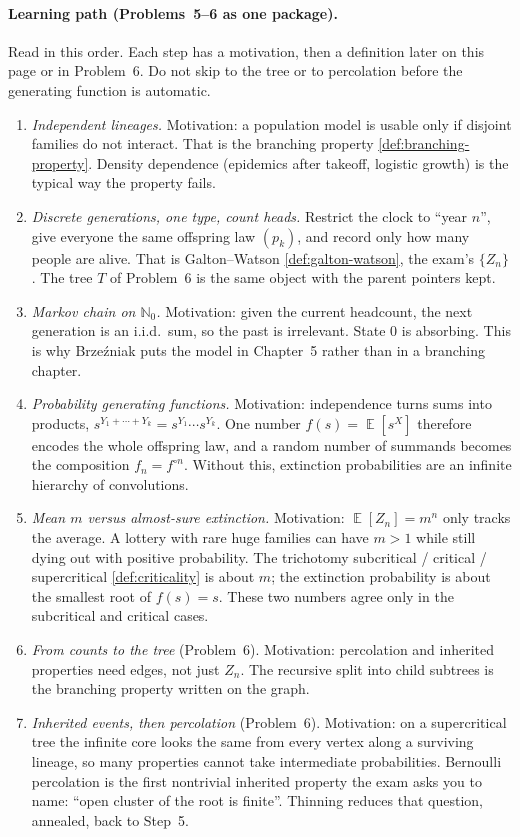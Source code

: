 \documentclass[11pt,a4paper]{article}
\DeclareMathOperator{\E}{\mathbb{E}}
\begin{document}
\paragraph{Learning path (Problems~5--6 as one package).}
Read in this order. Each step has a motivation, then a definition later on this page or in Problem~6. Do not skip to the tree or to percolation before the generating function is automatic.

\begin{enumerate}[label=\textup{Step~\arabic*.}]
    \item
    \emph{Independent lineages.} Motivation: a population model is usable only if disjoint families do not interact. That is the branching property \cref{def:branching-property}. Density dependence (epidemics after takeoff, logistic growth) is the typical way the property fails.
    \item
    \emph{Discrete generations, one type, count heads.} Restrict the clock to ``year \(n\)'', give everyone the same offspring law \((p_k)\), and record only how many people are alive. That is Galton--Watson \cref{def:galton-watson}, the exam's \(\{Z_n\}\). The tree \(T\) of Problem~6 is the same object with the parent pointers kept.
    \item
    \emph{Markov chain on \(\mathbb{N}_0\).} Motivation: given the current headcount, the next generation is an i.i.d.\ sum, so the past is irrelevant. State \(0\) is absorbing. This is why Brzeźniak puts the model in Chapter~5 rather than in a branching chapter.
    \item
    \emph{Probability generating functions.} Motivation: independence turns sums into products, \(s^{Y_1+\cdots+Y_k}=s^{Y_1}\cdots s^{Y_k}\). One number \(f(s)=\E[s^X]\) therefore encodes the whole offspring law, and a random number of summands becomes the composition \(f_n=f^{\circ n}\). Without this, extinction probabilities are an infinite hierarchy of convolutions.
    \item
    \emph{Mean \(m\) versus almost-sure extinction.} Motivation: \(\E[Z_n]=m^n\) only tracks the average. A lottery with rare huge families can have \(m>1\) while still dying out with positive probability. The trichotomy subcritical / critical / supercritical \cref{def:criticality} is about \(m\); the extinction probability is about the smallest root of \(f(s)=s\). These two numbers agree only in the subcritical and critical cases.
    \item
    \emph{From counts to the tree} (Problem~6). Motivation: percolation and inherited properties need edges, not just \(Z_n\). The recursive split into child subtrees is the branching property written on the graph.
    \item
    \emph{Inherited events, then percolation} (Problem~6). Motivation: on a supercritical tree the infinite core looks the same from every vertex along a surviving lineage, so many properties cannot take intermediate probabilities. Bernoulli percolation is the first nontrivial inherited property the exam asks you to name: ``open cluster of the root is finite''. Thinning reduces that question, annealed, back to Step~5.
\end{enumerate}
\end{document}
